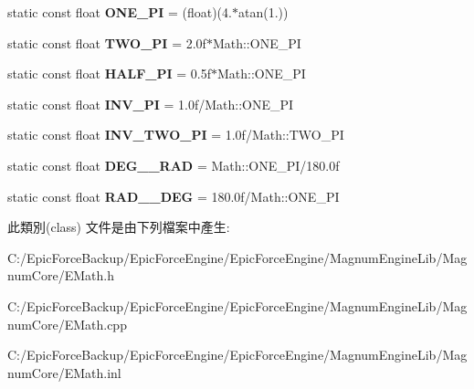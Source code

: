 \begin{DoxyCompactItemize}
\item 
static const float {\bfseries O\+N\+E\+\_\+\+PI} = (float)(4.$\ast$atan(1.))\hypertarget{class_magnum_1_1_math_ad52cde3d18fcc4f764f341ef400def94}{}\label{class_magnum_1_1_math_ad52cde3d18fcc4f764f341ef400def94}

\item 
static const float {\bfseries T\+W\+O\+\_\+\+PI} = 2.\+0f$\ast$\+Math\+::\+O\+N\+E\+\_\+\+PI\hypertarget{class_magnum_1_1_math_a52cf11c3d21a83ced7f3e73d73b438bf}{}\label{class_magnum_1_1_math_a52cf11c3d21a83ced7f3e73d73b438bf}

\item 
static const float {\bfseries H\+A\+L\+F\+\_\+\+PI} = 0.\+5f$\ast$\+Math\+::\+O\+N\+E\+\_\+\+PI\hypertarget{class_magnum_1_1_math_a6475d0f7b5d131ca9bacd916606bf295}{}\label{class_magnum_1_1_math_a6475d0f7b5d131ca9bacd916606bf295}

\item 
static const float {\bfseries I\+N\+V\+\_\+\+PI} = 1.\+0f/\+Math\+::\+O\+N\+E\+\_\+\+PI\hypertarget{class_magnum_1_1_math_a5954722d80833720f554201d313c5d69}{}\label{class_magnum_1_1_math_a5954722d80833720f554201d313c5d69}

\item 
static const float {\bfseries I\+N\+V\+\_\+\+T\+W\+O\+\_\+\+PI} = 1.\+0f/\+Math\+::\+T\+W\+O\+\_\+\+PI\hypertarget{class_magnum_1_1_math_adb1ecdad67471d15135877d1992671da}{}\label{class_magnum_1_1_math_adb1ecdad67471d15135877d1992671da}

\item 
static const float {\bfseries D\+E\+G\+\_\+\_\+\+R\+AD} = Math\+::\+O\+N\+E\+\_\+\+PI/180.\+0f\hypertarget{class_magnum_1_1_math_ab6311d204c0b5e2548d07ad76939f6cf}{}\label{class_magnum_1_1_math_ab6311d204c0b5e2548d07ad76939f6cf}

\item 
static const float {\bfseries R\+A\+D\+\_\+\_\+\+D\+EG} = 180.\+0f/\+Math\+::\+O\+N\+E\+\_\+\+PI\hypertarget{class_magnum_1_1_math_a74da48ccd07882f5407afc9eb02edf23}{}\label{class_magnum_1_1_math_a74da48ccd07882f5407afc9eb02edf23}

\end{DoxyCompactItemize}


此類別(class) 文件是由下列檔案中產生\+:\begin{DoxyCompactItemize}
\item 
C\+:/\+Epic\+Force\+Backup/\+Epic\+Force\+Engine/\+Epic\+Force\+Engine/\+Magnum\+Engine\+Lib/\+Magnum\+Core/E\+Math.\+h\item 
C\+:/\+Epic\+Force\+Backup/\+Epic\+Force\+Engine/\+Epic\+Force\+Engine/\+Magnum\+Engine\+Lib/\+Magnum\+Core/E\+Math.\+cpp\item 
C\+:/\+Epic\+Force\+Backup/\+Epic\+Force\+Engine/\+Epic\+Force\+Engine/\+Magnum\+Engine\+Lib/\+Magnum\+Core/E\+Math.\+inl\end{DoxyCompactItemize}
